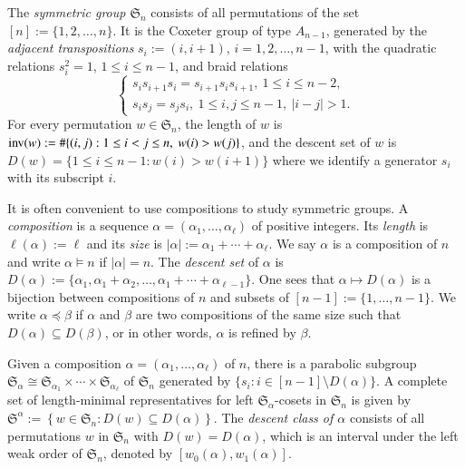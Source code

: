\documentclass{amsart}
\newtheorem*{Young's Rule}{Young's Rule}
\theoremstyle{definition}
\theoremstyle{remark}
\numberwithin{equation}{section}
\begin{document}
The \emph{symmetric group ${{\mathfrak S}}_n$} consists of all permutations of the set $[n]:=\{1,2,\ldots,n\}$. It is the Coxeter group of type $A_{n-1}$, generated by the \emph{adjacent transpositions} $s_i:=(i,i+1)$, $i=1,2,\ldots,n-1$, with the quadratic relations $s_i^2=1$, $1\le i \le n-1$, and braid relations 
\[\begin{cases}
s_is_{i+1}s_i = s_{i+1}s_is_{i+1},\ 1\le i\le n-2,\\
s_is_j=s_js_i,\ 1\le i,j\le n-1,\ |i-j|>1.
\end{cases}\]
For every permutation $w\in{{\mathfrak S}}_n$, the length of $w$ is ${{\rm inv}}(w):=\#\{(i,j):1\le i<j\le n,\ w(i)>w(j)\}$, and the descent set of $w$ is $D(w)=\{ 1\le i\le n-1: w(i)>w(i+1)\}$ where we identify a generator $s_i$ with its subscript $i$.

It is often convenient to use compositions to study symmetric groups. A \emph{composition} is a sequence $\alpha=(\alpha_1,\ldots,\alpha_\ell)$ of positive integers. Its \emph{length} is $\ell(\alpha):=\ell$ and its \emph{size} is $|\alpha|:=\alpha_1+\cdots+\alpha_\ell$. We say $\alpha$ is a composition of $n$ and write $\alpha\models n$ if $|\alpha|=n$. The \emph{descent set} of $\alpha$ is 
$
D(\alpha):=\{\alpha_1,\alpha_1+\alpha_2,\ldots,\alpha_1+\cdots+\alpha_{\ell-1}\}.
$
One sees that $\alpha\mapsto D(\alpha)$ is a bijection between compositions of $n$ and subsets of $[n-1]:=\{1,\ldots,n-1\}$. We write $\alpha{\operatorname{\preccurlyeq}}\beta$ if $\alpha$ and $\beta$ are two compositions of the same size such that $D(\alpha)\subseteq D(\beta)$, or in other words, $\alpha$ is refined by $\beta$.

Given a composition $\alpha=(\alpha_1,\ldots,\alpha_\ell)$ of $n$, there is a parabolic subgroup ${{\mathfrak S}}_\alpha\cong{{\mathfrak S}}_{\alpha_1}\times\cdots\times{{\mathfrak S}}_{\alpha_\ell}$ of ${{\mathfrak S}}_n$ generated by $\{s_i:i\in [n-1]\setminus D(\alpha)\}$. A complete set of length-minimal representatives for left ${{\mathfrak S}}_\alpha$-cosets in ${{\mathfrak S}}_n$ is given by
$ {{\mathfrak S}}^\alpha:= \left \{ w \in{{\mathfrak S}}_n: D(w)\subseteq D(\alpha) \right \}. $
The \emph{descent class of $\alpha$} consists of all permutations $w$ in ${{\mathfrak S}}_n$ with $D(w)=D(\alpha)$, which is an interval under the left weak order of ${{\mathfrak S}}_n$, denoted by $[w_0(\alpha),w_1(\alpha)]$. 
\end{document}
